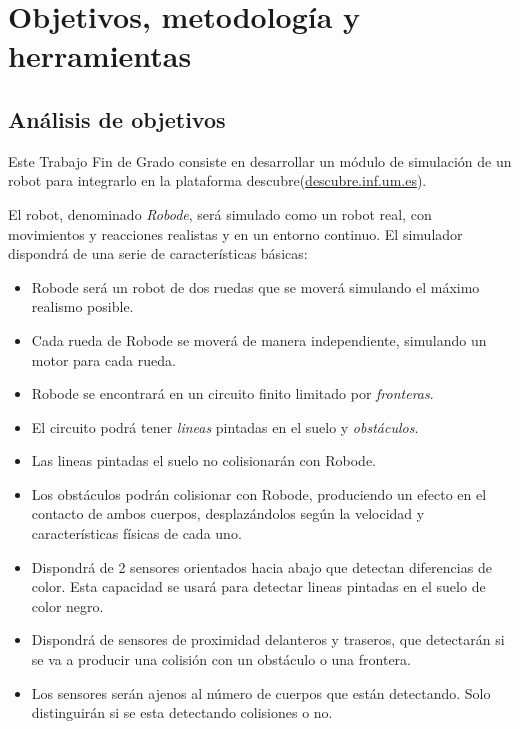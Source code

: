 \chapter{Objetivos, metodología y herramientas}
\label{objetivos-metodologia-herramientas}

\section{Análisis de objetivos}
\label{sec:objetivos}

Este Trabajo Fin de Grado consiste en desarrollar un módulo de simulación de un robot para integrarlo en la plataforma \Gls{descubre}(\url{descubre.inf.um.es}).

El robot, denominado \emph{Robode}, será simulado como un robot real, con movimientos y reacciones realistas y en un entorno continuo. El simulador dispondrá de una serie de características básicas:
\begin{itemize}
	\item Robode será un robot de dos ruedas que se moverá simulando el máximo realismo posible.
	\item Cada rueda de Robode se moverá de manera independiente, simulando un motor para cada rueda. 
	\item Robode se encontrará en un circuito finito limitado por \emph{fronteras}.
	\item El circuito podrá tener \emph{lineas} pintadas en el suelo y \emph{obstáculos}.
	\item Las lineas pintadas el suelo no colisionarán con Robode.
	\item Los obstáculos podrán colisionar con Robode, produciendo un efecto en el contacto de ambos cuerpos, desplazándolos según la velocidad y características físicas de cada uno.
	\item Dispondrá de 2 sensores orientados hacia abajo que detectan diferencias de color. Esta capacidad se usará para detectar lineas pintadas en el suelo de color negro.
	\item Dispondrá de sensores de proximidad delanteros y traseros, que detectarán si se va a producir una colisión con un obstáculo o una frontera.
	\item Los sensores serán ajenos al número de cuerpos que están detectando. Solo distinguirán si se esta detectando colisiones o no.
\end{itemize}



